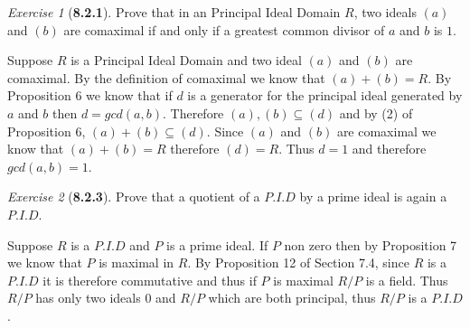 \documentclass[12pt]{amsart}
\makeatletter
\theoremstyle{remark}
\newtheorem*{exercise}{Exercise}%
\renewenvironment{proof}[1][\proofname]{\par\doublespacing
  \pushQED{\qed}%
  \normalfont \topsep6\p@\@plus6\p@\relax
  \list{}{%
    \settowidth{\leftmargin}{\itshape\proofname:\hskip\labelsep}%
    \setlength{\labelwidth}{0pt}%
    \setlength{\itemindent}{-\leftmargin}%
  }%
  \item[\hskip\labelsep\itshape#1\@addpunct{:}]\ignorespaces
}{%
  \popQED\endlist\@endpefalse
  \singlespacing
}
\theoremstyle{mycomment}
\makeatother
\begin{document}
\begin{exercise}[\textbf{8.2.1}]  Prove that in an Principal Ideal Domain $R$, two ideals $(a)$ and $(b)$ 
  are comaximal if and only if a greatest common divisor of $a$ and $b$ is $1$. 
    \begin{proof} Suppose $R$ is a Principal Ideal Domain and two ideal $(a)$ and $(b)$ 
      are comaximal. By the definition of comaximal we know that $(a) + (b) = R$. By Proposition 6 we know that if 
      $d$ is a generator for the principal ideal generated by $a$ and $b$ then $d = gcd(a, b)$. Therefore $(a), (b) \subseteq (d)$ and 
      by (2) of Proposition 6, $(a) + (b) \subseteq (d)$. Since $(a)$ and $(b)$ are comaximal we know that $(a) + (b) = R$ therefore $(d) = R$. 
      Thus $d = 1$ and therefore $gcd(a, b) = 1$. 

       \end{proof}

\end{exercise}
\vspace{.5in}


\begin{exercise}[\textbf{8.2.3}] Prove that a quotient of a $P.I.D$ by a prime ideal is again a $P.I.D$.
    \begin{proof} Suppose $R$ is a $P.I.D$ and $P$ is a prime ideal. If $P$ non zero then by Proposition 7
      we know that $P$ is maximal in $R$. By Proposition 12 of Section 7.4, since $R$ is a $P.I.D$ it is therefore commutative and thus 
      if $P$ is maximal $R/P$ is a field. Thus $R/P$ has only two ideals $0$ and $R/P$ which are both principal, thus $R/P$ is a $P.I.D$.
       \end{proof}

\end{exercise}
\vspace{.5in}
\end{document}
